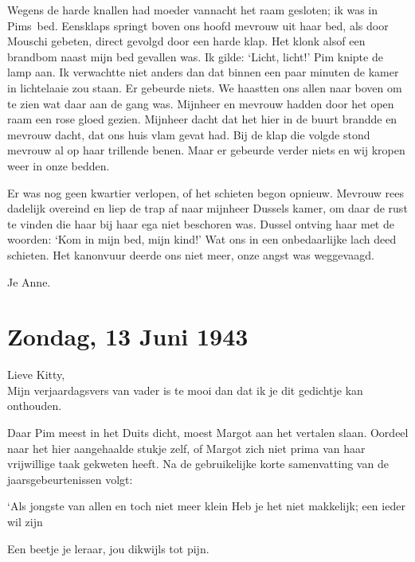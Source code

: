 \documentclass{book}
\begin{document}
Wegens de harde knallen had moeder vannacht het raam gesloten; ik was in
Pims~bed. Eensklaps springt boven ons hoofd mevrouw uit haar bed, als door
Mouschi gebeten, direct gevolgd door een harde klap. Het klonk alsof een
brandbom naast mijn bed gevallen was. Ik gilde: `Licht, licht!' Pim knipte de
lamp aan. Ik verwachtte niet anders dan dat binnen een paar minuten de kamer in
lichtelaaie zou staan. Er gebeurde niets.  We haastten ons allen naar boven om
te zien wat daar aan de gang was.  Mijnheer en mevrouw hadden door het open raam
een rose gloed gezien.  Mijnheer dacht dat het hier in de buurt brandde en
mevrouw dacht, dat ons huis vlam gevat had. Bij de klap die volgde stond mevrouw
al op haar trillende benen. Maar er gebeurde verder niets en wij kropen weer in
onze bedden.

Er was nog geen kwartier verlopen, of het schieten begon opnieuw.  Mevrouw rees
dadelijk overeind en liep de trap af naar mijnheer Dussels kamer, om daar de
rust te vinden die haar bij haar ega niet beschoren was. Dussel ontving haar met
de woorden: `Kom in mijn bed, mijn kind!' Wat ons in een onbedaarlijke lach deed
schieten. Het kanonvuur deerde ons niet meer, onze angst was weggevaagd.

Je Anne.

\section*{Zondag, 13 Juni 1943}

Lieve Kitty,\\
Mijn verjaardagsvers van vader is te mooi dan dat ik je dit
gedichtje kan onthouden.

Daar Pim meest in het Duits dicht, moest Margot aan het vertalen slaan.  Oordeel
naar het hier aangehaalde stukje zelf, of Margot zich niet prima van haar
vrijwillige taak gekweten heeft. Na de gebruikelijke korte samenvatting van de
jaarsgebeurtenissen volgt:

`Als jongste van allen en toch niet meer klein Heb je het niet makkelijk; een
ieder wil zijn

Een beetje je leraar, jou dikwijls tot pijn.
\end{document}
